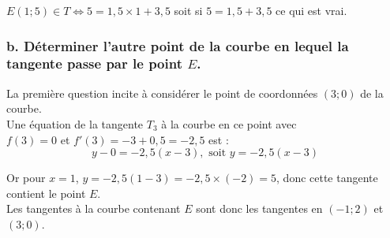 $E(1; 5) \in T \Leftrightarrow 5 = 1,5 \times 1 + 3,5$ soit si $5 = 1,5 + 3,5$ ce qui est vrai.
	
	\subsubsection*{b. Déterminer l'autre point de la courbe en lequel la tangente passe par le point $E$.}
	
La première question incite à considérer le point de coordonnées $(3; 0)$ de la courbe.\\
Une équation de la tangente $T_3$ à la courbe en ce point avec \\
$f(3) = 0$ et $f'(3) = -3 + 0,5 = -2,5$ est :
\[	y - 0 = -2,5(x - 3), \text{ soit } y = -2,5(x - 3)
	\]
	
Or pour $x = 1$, $y = -2,5(1 - 3) = -2,5 \times (-2) = 5$, donc cette tangente contient le point $E$.\\
 Les tangentes à la courbe contenant $E$ sont donc les tangentes en $(-1; 2)$ et $(3; 0)$.
